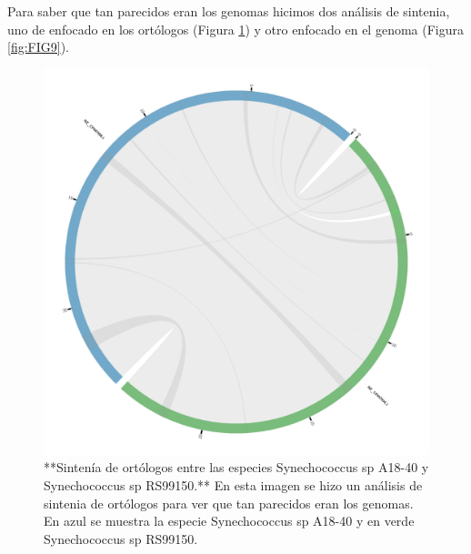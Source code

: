 \documentclass[
]{book}
\begin{document}
Para saber que tan parecidos eran los genomas hicimos dos análisis de sintenia, uno de enfocado en los ortólogos (Figura \ref{fig:FIG8}) y otro enfocado en el genoma (Figura \ref{fig:FIG9}).

\begin{figure}

{\centering \includegraphics[width=0.75\linewidth]{figures/circos} 

}

\caption{**Sintenía de ortólogos entre las especies Synechococcus sp A18-40 y Synechococcus sp RS99150.** En esta imagen se hizo un análisis de sintenia de ortólogos para ver que tan parecidos eran los genomas. En azul se muestra la especie Synechococcus sp A18-40 y en verde Synechococcus sp RS99150.}\label{fig:FIG8}
\end{figure}
\end{document}
